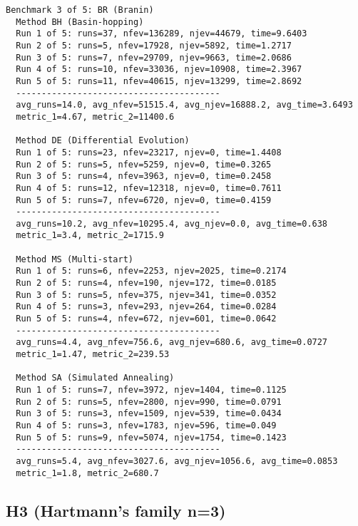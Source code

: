 \footnotesize
\begin{verbatim}
Benchmark 3 of 5: BR (Branin)
  Method BH (Basin-hopping)
  Run 1 of 5: runs=37, nfev=136289, njev=44679, time=9.6403
  Run 2 of 5: runs=5, nfev=17928, njev=5892, time=1.2717
  Run 3 of 5: runs=7, nfev=29709, njev=9663, time=2.0686
  Run 4 of 5: runs=10, nfev=33036, njev=10908, time=2.3967
  Run 5 of 5: runs=11, nfev=40615, njev=13299, time=2.8692
  ----------------------------------------
  avg_runs=14.0, avg_nfev=51515.4, avg_njev=16888.2, avg_time=3.6493
  metric_1=4.67, metric_2=11400.6

  Method DE (Differential Evolution)
  Run 1 of 5: runs=23, nfev=23217, njev=0, time=1.4408
  Run 2 of 5: runs=5, nfev=5259, njev=0, time=0.3265
  Run 3 of 5: runs=4, nfev=3963, njev=0, time=0.2458
  Run 4 of 5: runs=12, nfev=12318, njev=0, time=0.7611
  Run 5 of 5: runs=7, nfev=6720, njev=0, time=0.4159
  ----------------------------------------
  avg_runs=10.2, avg_nfev=10295.4, avg_njev=0.0, avg_time=0.638
  metric_1=3.4, metric_2=1715.9

  Method MS (Multi-start)
  Run 1 of 5: runs=6, nfev=2253, njev=2025, time=0.2174
  Run 2 of 5: runs=4, nfev=190, njev=172, time=0.0185
  Run 3 of 5: runs=5, nfev=375, njev=341, time=0.0352
  Run 4 of 5: runs=3, nfev=293, njev=264, time=0.0284
  Run 5 of 5: runs=4, nfev=672, njev=601, time=0.0642
  ----------------------------------------
  avg_runs=4.4, avg_nfev=756.6, avg_njev=680.6, avg_time=0.0727
  metric_1=1.47, metric_2=239.53

  Method SA (Simulated Annealing)
  Run 1 of 5: runs=7, nfev=3972, njev=1404, time=0.1125
  Run 2 of 5: runs=5, nfev=2800, njev=990, time=0.0791
  Run 3 of 5: runs=3, nfev=1509, njev=539, time=0.0434
  Run 4 of 5: runs=3, nfev=1783, njev=596, time=0.049
  Run 5 of 5: runs=9, nfev=5074, njev=1754, time=0.1423
  ----------------------------------------
  avg_runs=5.4, avg_nfev=3027.6, avg_njev=1056.6, avg_time=0.0853
  metric_1=1.8, metric_2=680.7

\end{verbatim}

\subsection{H3 (Hartmann's family n=3)}

